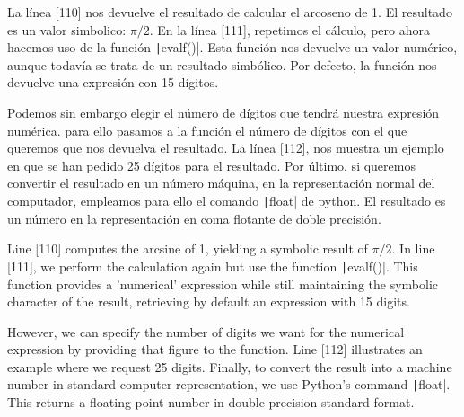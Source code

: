 \begin{paracol}{2}
La línea [110] nos devuelve el resultado de calcular el arcoseno de 1. El resultado es un valor simbolico: $\pi/2$. En la línea [111], repetimos el cálculo, pero ahora hacemos uso de la función \texttt|evalf()|. Esta función nos devuelve un valor numérico, aunque todavía se trata de un resultado simbólico. Por defecto, la función nos devuelve una expresión con 15 dígitos. 

Podemos sin embargo elegir el número de dígitos que tendrá nuestra expresión numérica. para ello pasamos a la función el número de dígitos con el que queremos que nos devuelva el resultado. La línea [112], nos muestra un ejemplo en que se han pedido 25 dígitos para el resultado. Por último, si queremos convertir el resultado en un número máquina, en la representación normal del computador, empleamos para ello el comando \texttt|float| de python. El resultado es un número en la representación en coma flotante de doble precisión.

\switchcolumn
Line [110] computes the arcsine of 1, yielding a symbolic result of \(\pi/2\). In line [111], we perform the calculation again but use the function \texttt|evalf()|. This function provides a 'numerical' expression while still maintaining the symbolic character of the result, retrieving by default an expression with 15 digits.

However, we can specify the number of digits we want for the numerical expression by providing that figure to the function. Line [112] illustrates an example where we request 25 digits. Finally, to convert the result into a machine number in standard computer representation, we use Python's command \texttt|float|. This returns a floating-point number in double precision standard format.

\end{paracol}


